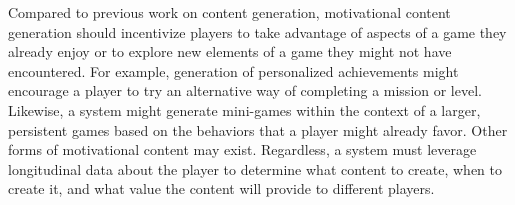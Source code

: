 \documentclass[conference]{IEEEtran}
\begin{document}
Compared to previous work on content generation, motivational content generation should incentivize players to take advantage of aspects of a game they already enjoy or to explore new elements of a game they might not have encountered.
For example, generation of personalized achievements might encourage a player to try an alternative way of completing a mission or level.  
Likewise, a system might generate mini-games within the context of a larger, persistent games based on the behaviors that a player might already favor.   
Other forms of motivational content may exist. Regardless, a system must leverage longitudinal data about the player to determine what content to create, when to create it, and what value the content will provide to different players. 
\end{document}
